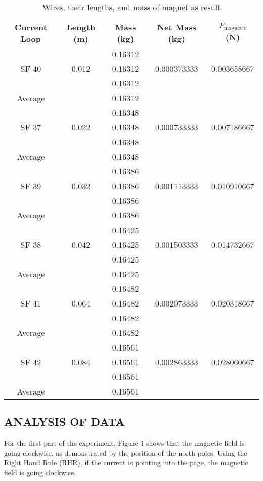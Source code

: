\documentclass [12pt, letterpaper, twoside] {article}
\begin{document}
\begin{table}
  \centering
  \begin{tabular}{| c | c | c | c | c |}
    \hline\hline
    Current Loop & Length (m) & Mass (kg) & Net Mass (kg) & \(F_{\text{magnetic}}\) (N) \\
    \hline
    \multirow{3}{*}{SF 40} & & 0.16312 & & \\
    & 0.012 & 0.16312 & 0.000373333 & 0.003658667 \\
    & & 0.16312 & & \\
    \hline
    Average & & 0.16312 & & \\
    \hline
    \multirow{3}{*}{SF 37} & & 0.16348 & & \\
    & 0.022 & 0.16348 & 0.000733333 & 0.007186667 \\
    & & 0.16348 & & \\
    \hline
    Average & & 0.16348 & & \\
    \hline
    \multirow{3}{*}{SF 39} & & 0.16386 & & \\
    & 0.032 & 0.16386 & 0.001113333 & 0.010910667 \\
    & & 0.16386 & & \\
    \hline
    Average & & 0.16386 & & \\
    \hline
    \multirow{3}{*}{SF 38} & & 0.16425 & & \\
    & 0.042 & 0.16425 & 0.001503333 & 0.014732667 \\
    & & 0.16425 & & \\
    \hline
    Average & & 0.16425 & & \\
    \hline
    \multirow{3}{*}{SF 41} & & 0.16482 & & \\
    & 0.064 & 0.16482 & 0.002073333 & 0.020318667 \\
    & & 0.16482 & & \\
    \hline
    Average & & 0.16482 & & \\
    \hline
    \multirow{3}{*}{SF 42} & & 0.16561 & & \\
    & 0.084 & 0.16561 & 0.002863333 & 0.028060667 \\
    & & 0.16561 & & \\
    \hline
    Average & & 0.16561 & & \\
    \hline\hline
  \end{tabular}
  \caption{Wires, their lengths, and mass of magnet as result}
  \label{fig:tab2}
\end{table}

\subsection* {ANALYSIS OF DATA}
For the first part of the experiment, Figure 1 shows that the magnetic field is going clockwise, as demonstrated by the position of the north poles. Using the Right Hand Rule (RHR), if the current is pointing into the page, the magnetic field is going clockwise. 
\end{document}
